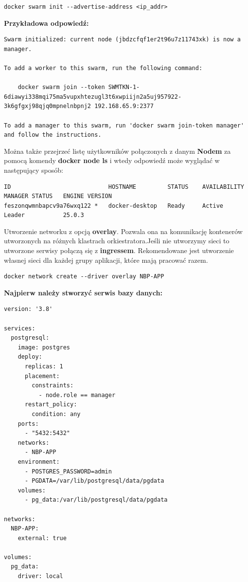 \documentclass{iiuwb}
\begin{document}
\begin{lstlisting}[breaklines=true]
docker swarm init --advertise-address <ip_addr>
\end{lstlisting}

\textbf{Przykładowa odpowiedź:}

\begin{lstlisting}[breaklines=true]
Swarm initialized: current node (jbdzcfqf1er2t96u7z11743xk) is now a manager.

To add a worker to this swarm, run the following command:

    docker swarm join --token SWMTKN-1-6diawyi338mqi75ma5vupxhtezugl3t6xwpiijn2a5uj957922-3k6gfgxj98qjq0mpnelnbpnj2 192.168.65.9:2377

To add a manager to this swarm, run 'docker swarm join-token manager' and follow the instructions.
\end{lstlisting}

Można także przejrzeć listę użytkowników połączonych z danym \textbf{Nodem}
za pomocą komendy \textbf{docker node ls} i wtedy odpowiedź może wyglądać 
w następujący sposób:

\begin{lstlisting}[breaklines=true]
ID                            HOSTNAME         STATUS    AVAILABILITY   MANAGER STATUS   ENGINE VERSION
feszonqwmnbapcv9a76wxq122 *   docker-desktop   Ready     Active         Leader           25.0.3  
\end{lstlisting}

Utworzenie networku z opcją \textbf{overlay}. Pozwala ona 
na komunikację kontenerów utworzonych na różnych klastrach
orkiestratora.Jeśli nie utworzymy sieci to utworzone serwisy połączą się z \textbf{ingressem}. 
Rekomendowane jest utworzenie własnej sieci dla każdej grupy aplikacji,
które mają pracować razem. 

\begin{lstlisting}[breaklines=true]
docker network create --driver overlay NBP-APP
\end{lstlisting}

\textbf{Najpierw należy stworzyć serwis bazy danych:}

\begin{lstlisting}[breaklines=true]
version: '3.8'

services:
  postgresql:
    image: postgres
    deploy:
      replicas: 1
      placement:
        constraints:
          - node.role == manager
      restart_policy:
        condition: any
    ports:
      - "5432:5432"
    networks:
      - NBP-APP
    environment:
      - POSTGRES_PASSWORD=admin
      - PGDATA=/var/lib/postgresql/data/pgdata
    volumes:
      - pg_data:/var/lib/postgresql/data/pgdata

networks:
  NBP-APP:
    external: true

volumes:
  pg_data:
    driver: local
\end{lstlisting}
\end{document}
